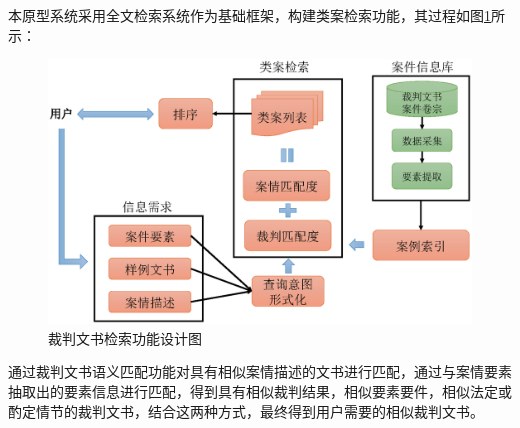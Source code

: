 本原型系统采用全文检索系统作为基础框架，构建类案检索功能，其过程如图\ref{fig:sys_recomm}所示：
\begin{figure}[htbp]%
    \centering
    \includegraphics[scale=0.48, clip=true]{./sources/sys_recomm.eps}
    \caption{\label{fig:sys_recomm}裁判文书检索功能设计图}
\end{figure}

通过裁判文书语义匹配功能对具有相似案情描述的文书进行匹配，通过与案情要素抽取出的要素信息进行匹配，得到具有相似裁判结果，相似要素要件，相似法定或酌定情节的裁判文书，结合这两种方式，最终得到用户需要的相似裁判文书。


